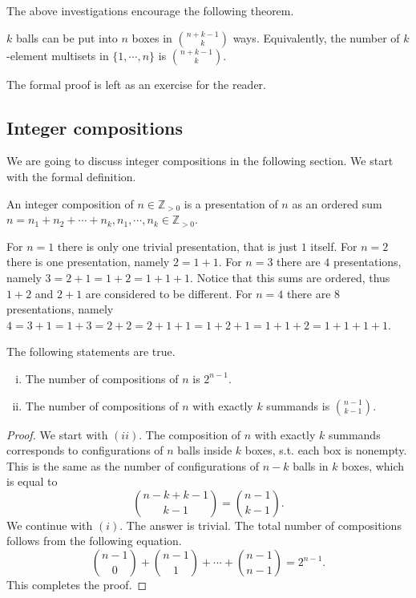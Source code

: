 The above investigations encourage the following theorem.

\begin{theorem}
$k$ balls can be put into $n$ boxes in ${n+k-1 \choose k}$ ways. Equivalently, the number of $k$-element multisets in $\{1, \cdots, n\}$ is ${n+k-1 \choose k}$.
\end{theorem}
\noindent
The formal proof is left as an exercise for the reader.

\subsection{Integer compositions}

We are going to discuss integer compositions in the following section. We start with the formal definition.

\begin{defn}
An integer composition of $n \in \mathbb{Z}_{> 0}$ is a presentation of $n$ as  an ordered sum $n=n_1 + n_2 + \cdots + n_k, n_1,\cdots,n_k \in \mathbb{Z}_{> 0}$.
\end{defn}

\begin{exmp}
For $n=1$ there is only one trivial presentation, that is just $1$ itself. For $n=2$ there is one presentation, namely $2=1+1$. For $n=3$ there are $4$ presentations,
 namely $3=2+1=1+2=1+1+1$. Notice that this sums are ordered, thus $1+2$ and $2+1$ are considered to be different.
 For $n=4$ there are $8$ presentations, namely $4=3+1=1+3=2+2=2+1+1=1+2+1=1+1+2=1+1+1+1$.
\end{exmp}

\begin{theorem} The following statements are true.
\begin{enumerate}[(i)]
    \item The number of compositions of $n$ is $2^{n-1}$.
    \item The number of compositions of $n$ with exactly $k$ summands is ${n-1 \choose k-1}$.
\end{enumerate}
\end{theorem}

\begin{proof}
We start with $(ii)$. The composition of $n$ with exactly $k$ summands corresponds to configurations of $n$ balls 
inside $k$ boxes, s.t. each box is nonempty. This is the same as the number of configurations of $n-k$ balls in $k$ boxes, 
which is equal to
$$
{n-k+k-1 \choose k-1} = {n-1 \choose k-1}.
$$
We continue with $(i)$. The answer is trivial. The total number of compositions follows from the following equation.
$$
{n-1 \choose 0} + {n-1 \choose 1} + \cdots + {n-1 \choose n-1}=2^{n-1}.
$$
This completes the proof.
\end{proof}

